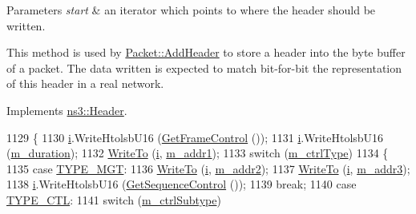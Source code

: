 \begin{DoxyParams}{Parameters}
{\em start} & an iterator which points to where the header should be written.\\
\hline
\end{DoxyParams}
This method is used by \hyperlink{classns3_1_1Packet_a465108c595a0bc592095cbcab1832ed8}{Packet\+::\+Add\+Header} to store a header into the byte buffer of a packet. The data written is expected to match bit-\/for-\/bit the representation of this header in a real network. 

Implements \hyperlink{classns3_1_1Header_afb61f1aac69ff8349a6bfe521fab5404}{ns3\+::\+Header}.


\begin{DoxyCode}
1129 \{
1130   \hyperlink{bernuolliDistribution_8m_a6f6ccfcf58b31cb6412107d9d5281426}{i}.WriteHtolsbU16 (\hyperlink{classns3_1_1WifiMacHeader_a8528031b4811577ed7b6e379f683180b}{GetFrameControl} ());
1131   \hyperlink{bernuolliDistribution_8m_a6f6ccfcf58b31cb6412107d9d5281426}{i}.WriteHtolsbU16 (\hyperlink{classns3_1_1WifiMacHeader_a7adb3f465d0b7474cdceefc8ab993513}{m\_duration});
1132   \hyperlink{namespacens3_abe3cb0173e87a3f7e2e414358c0a08bf}{WriteTo} (\hyperlink{bernuolliDistribution_8m_a6f6ccfcf58b31cb6412107d9d5281426}{i}, \hyperlink{classns3_1_1WifiMacHeader_a308c3d706ac2118142a76a261847629a}{m\_addr1});
1133   \textcolor{keywordflow}{switch} (\hyperlink{classns3_1_1WifiMacHeader_ab52a154d49008400f121527257e195c6}{m\_ctrlType})
1134     \{
1135     \textcolor{keywordflow}{case} \hyperlink{namespacens3_a603b558354194a90924d823ee16714d5afd692263674e4de879dc6068193e9109}{TYPE\_MGT}:
1136       \hyperlink{namespacens3_abe3cb0173e87a3f7e2e414358c0a08bf}{WriteTo} (\hyperlink{bernuolliDistribution_8m_a6f6ccfcf58b31cb6412107d9d5281426}{i}, \hyperlink{classns3_1_1WifiMacHeader_a6476ca1eb2261edf7914c97a71743f1d}{m\_addr2});
1137       \hyperlink{namespacens3_abe3cb0173e87a3f7e2e414358c0a08bf}{WriteTo} (\hyperlink{bernuolliDistribution_8m_a6f6ccfcf58b31cb6412107d9d5281426}{i}, \hyperlink{classns3_1_1WifiMacHeader_adc7482e08ca2c700dce938d9d051bc43}{m\_addr3});
1138       \hyperlink{bernuolliDistribution_8m_a6f6ccfcf58b31cb6412107d9d5281426}{i}.WriteHtolsbU16 (\hyperlink{classns3_1_1WifiMacHeader_a9d6c7e809271331e5271d29e58800593}{GetSequenceControl} ());
1139       \textcolor{keywordflow}{break};
1140     \textcolor{keywordflow}{case} \hyperlink{namespacens3_a603b558354194a90924d823ee16714d5a6bf551e888b66c99bac335b629e3001c}{TYPE\_CTL}:
1141       \textcolor{keywordflow}{switch} (\hyperlink{classns3_1_1WifiMacHeader_a512ea2949efb1e5f69b8ea9165441f7d}{m\_ctrlSubtype})

\end{DoxyCode}
